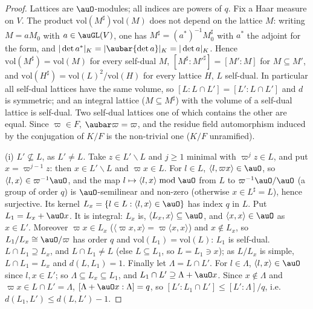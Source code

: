 \documentclass[10pt]{amsart}
\theoremstyle{definition}
\theoremstyle{remark}
\begin{document}
\begin{proof}
Lattices are $\auO$-modules; all indices are powers of $q$. Fix a Haar measure on $V$. The product
$\mathrm{vol}(M^\sharp)\mathrm{vol}(M)$ does not depend on the lattice $M$: writing $M=aM_0$ with
$a\in\auGL(V)$, one has $M^\sharp=(a^*)^{-1}M_0^\sharp$ with $a^*$ the adjoint for the form, and
$|\det a^*|_K=|\aubar{\det a}|_K=|\det a|_K$. Hence $\mathrm{vol}(M^\sharp)=\mathrm{vol}(M)$ for every
self-dual $M$, $[M^\sharp:M'^\sharp]=[M':M]$ for
$M\subseteq M'$, and $\mathrm{vol}(H^\sharp)=\mathrm{vol}(L)^2/\mathrm{vol}(H)$ for every lattice $H$, $L$
self-dual. In particular all self-dual lattices have the same volume, so $[L:L\cap
L']=[L':L\cap L']$ and $d$ is symmetric; and an integral lattice ($M\subseteq M^\sharp$) with the volume
of a self-dual lattice is self-dual. Two self-dual lattices one of which contains the other are equal.
Since $\varpi\in F$, $\aubar\varpi=\varpi$, and the residue field automorphism induced by the conjugation
of $K/F$ is the non-trivial one ($K/F$ unramified).

(i) $L'\not\subseteq L$, as $L'\ne L$. Take $z\in L'\smallsetminus L$ and $j\ge1$ minimal with
$\varpi^jz\in L$, and put $x=\varpi^{j-1}z$: then $x\in L'\smallsetminus L$ and $\varpi x\in L$. For
$l\in L$, $\langle l,\varpi x\rangle\in\auO$, so $\langle l,x\rangle\in\varpi^{-1}\auO$, and the map
$l\mapsto\langle l,x\rangle\bmod\auO$ from $L$ to $\varpi^{-1}\auO/\auO$ (a group of order $q$) is
$\auO$-semilinear and non-zero (otherwise $x\in L^\sharp=L$), hence surjective. Its kernel
$L_x=\{l\in L:\langle l,x\rangle\in\auO\}$ has index $q$ in $L$. Put $L_1=L_x+\auO x$. It is integral:
$L_x$ is, $\langle L_x,x\rangle\subseteq\auO$, and $\langle x,x\rangle\in\auO$ as $x\in L'$. Moreover
$\varpi x\in L_x$ ($\langle\varpi x,x\rangle=\varpi\langle x,x\rangle$) and $x\notin L_x$, so
$L_1/L_x\cong\auO/\varpi$ has order $q$ and $\mathrm{vol}(L_1)=\mathrm{vol}(L)$: $L_1$ is self-dual.
$L\cap L_1\supseteq L_x$, and $L\cap L_1\ne L$ (else $L\subseteq L_1$, so $L=L_1\ni x$); as $L/L_x$ is
simple, $L\cap L_1=L_x$ and $d(L,L_1)=1$. Finally let $\Lambda=L\cap L'$. For $l\in\Lambda$,
$\langle l,x\rangle\in\auO$ since $l,x\in L'$; so $\Lambda\subseteq L_x\subseteq L_1$, and
$L_1\cap L'\supseteq\Lambda+\auO x$. Since $x\notin\Lambda$ and $\varpi x\in L\cap L'=\Lambda$,
$[\Lambda+\auO x:\Lambda]=q$, so $[L':L_1\cap L']\le[L':\Lambda]/q$, i.e.\ $d(L_1,L')\le d(L,L')-1$.


\end{proof}
\end{document}
